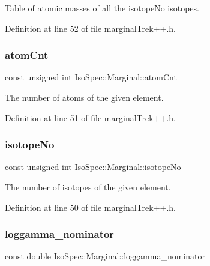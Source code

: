Table of atomic masses of all the isotope\+No isotopes. 

Definition at line 52 of file marginal\+Trek++.\+h.

\mbox{\label{class_iso_spec_1_1_marginal_a53c2af7dcb84aa9d5e0e0918fe7875cd}} 
\subsubsection{\texorpdfstring{atom\+Cnt}{atomCnt}}
{\footnotesize\ttfamily const unsigned int Iso\+Spec\+::\+Marginal\+::atom\+Cnt\hspace{0.3cm}{\ttfamily [protected]}}

The number of atoms of the given element. 

Definition at line 51 of file marginal\+Trek++.\+h.

\mbox{\label{class_iso_spec_1_1_marginal_a8dd6415882661f7b9ceedbe09bc200e3}} 
\subsubsection{\texorpdfstring{isotope\+No}{isotopeNo}}
{\footnotesize\ttfamily const unsigned int Iso\+Spec\+::\+Marginal\+::isotope\+No\hspace{0.3cm}{\ttfamily [protected]}}

The number of isotopes of the given element. 

Definition at line 50 of file marginal\+Trek++.\+h.

\mbox{\label{class_iso_spec_1_1_marginal_aa3fb5ed3a9b63a855d6270287aed7417}} 
\subsubsection{\texorpdfstring{loggamma\+\_\+nominator}{loggamma\_nominator}}
{\footnotesize\ttfamily const double Iso\+Spec\+::\+Marginal\+::loggamma\+\_\+nominator\hspace{0.3cm}{\ttfamily [protected]}}

